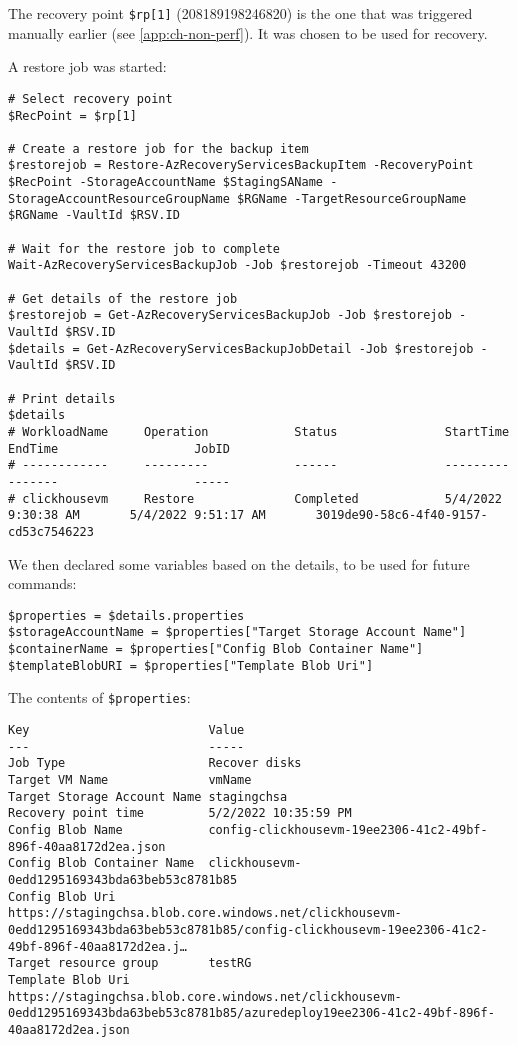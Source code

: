 The recovery point \texttt{\$rp[1]} (208189198246820) is the one that was triggered manually earlier (see \ref{app:ch-non-perf}).
It was chosen to be used for recovery.

A restore job was started:
\begin{verbatim}
# Select recovery point
$RecPoint = $rp[1]

# Create a restore job for the backup item
$restorejob = Restore-AzRecoveryServicesBackupItem -RecoveryPoint $RecPoint -StorageAccountName $StagingSAName -StorageAccountResourceGroupName $RGName -TargetResourceGroupName $RGName -VaultId $RSV.ID

# Wait for the restore job to complete
Wait-AzRecoveryServicesBackupJob -Job $restorejob -Timeout 43200

# Get details of the restore job
$restorejob = Get-AzRecoveryServicesBackupJob -Job $restorejob -VaultId $RSV.ID
$details = Get-AzRecoveryServicesBackupJobDetail -Job $restorejob -VaultId $RSV.ID

# Print details
$details
# WorkloadName     Operation            Status               StartTime                 EndTime                   JobID
# ------------     ---------            ------               ---------                 -------                   -----
# clickhousevm     Restore              Completed            5/4/2022 9:30:38 AM       5/4/2022 9:51:17 AM       3019de90-58c6-4f40-9157-cd53c7546223
\end{verbatim}

We then declared some variables based on the details, to be used for future commands:
\begin{verbatim}
$properties = $details.properties
$storageAccountName = $properties["Target Storage Account Name"]
$containerName = $properties["Config Blob Container Name"]
$templateBlobURI = $properties["Template Blob Uri"]
\end{verbatim}

The contents of \texttt{\$properties}:
\begin{verbatim}
Key                         Value
---                         -----
Job Type                    Recover disks
Target VM Name              vmName
Target Storage Account Name stagingchsa
Recovery point time         5/2/2022 10:35:59 PM
Config Blob Name            config-clickhousevm-19ee2306-41c2-49bf-896f-40aa8172d2ea.json
Config Blob Container Name  clickhousevm-0edd1295169343bda63beb53c8781b85
Config Blob Uri             https://stagingchsa.blob.core.windows.net/clickhousevm-0edd1295169343bda63beb53c8781b85/config-clickhousevm-19ee2306-41c2-49bf-896f-40aa8172d2ea.j…
Target resource group       testRG
Template Blob Uri           https://stagingchsa.blob.core.windows.net/clickhousevm-0edd1295169343bda63beb53c8781b85/azuredeploy19ee2306-41c2-49bf-896f-40aa8172d2ea.json
\end{verbatim}

